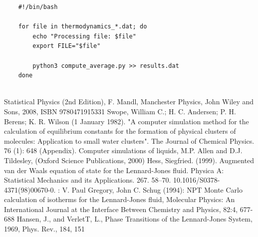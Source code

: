 \documentclass[a4paper,10pt]{article}
\begin{document}
\begin{lstlisting}
	#!/bin/bash
	
	for file in thermodynamics_*.dat; do
		echo "Processing file: $file"
		export FILE="$file"

		python3 compute_average.py >> results.dat
	done
	
\end{lstlisting}	

\begin{thebibliography}{100}
	 Statistical Physics (2nd Edition), F. Mandl, Manchester Physics, John Wiley and Sons, 2008, ISBN 9780471915331
	 Swope, William C.; H. C. Andersen; P. H. Berens; K. R. Wilson (1 January 1982). "A computer simulation method for the calculation of equilibrium constants for the formation of physical clusters of molecules: Application to small water clusters". The Journal of Chemical Physics. 76 (1): 648 (Appendix).
	 Computer simulations of liquids, M.P. Allen and D.J. Tildesley, (Oxford Science Publications, 2000) 
	 Hess, Siegfried. (1999). Augmented van der Waals equation of state for the Lennard-Jones fluid. Physica A: Statistical Mechanics and its Applications. 267. 58–70. 10.1016/S0378-4371(98)00670-0. 
	: V. Paul Gregory, John C. Schug (1994): NPT Monte Carlo calculation of
	isotherms for the Lennard-Jones fluid, Molecular Physics: An International Journal at the Interface
	Between Chemistry and Physics, 82:4, 677-688
	  Hansen, J., and VerletT, L., Phase Transitions of the Lennard-Jones System, 1969, Phys. Rev., 184, 151

\end{thebibliography}
\end{document}
